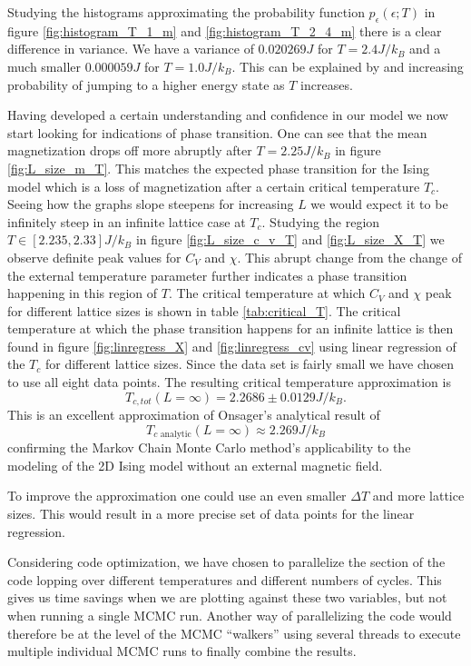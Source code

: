\documentclass[english,notitlepage,reprint,nofootinbib]{revtex4-1}  %
\begin{document}
Studying the histograms approximating the probability function $p_{\epsilon}(\epsilon;T)$ in figure \ref{fig:histogram_T_1_m} and \ref{fig:histogram_T_2_4_m} there is a clear difference in variance. We have a variance of $0.020269 J$ for $T=2.4J/k_B$ and a much smaller $0.000059 J$ for $T=1.0J/k_B$. This can be explained by and increasing probability of jumping to a higher energy state as $T$ increases.

Having developed a certain understanding and confidence in our model we now start looking for indications of phase transition. One can see that the mean magnetization drops off more abruptly after $T=2.25 J/k_B$ in figure \ref{fig:L_size_m_T}. This matches the expected phase transition for the Ising model which is a loss of magnetization after a certain critical temperature $T_c$. Seeing how the graphs slope steepens for increasing $L$ we would expect it to be infinitely steep in an infinite lattice case at $T_c$. Studying the region $T \in [2.235,2.33]J/k_B$ in figure \ref{fig:L_size_c_v_T} and \ref{fig:L_size_X_T} we observe definite peak values for $C_V$ and $\chi$. This abrupt change from the change of the external temperature parameter further indicates a phase transition happening in this region of $T$. The critical temperature at which $C_V$ and $\chi$ peak for different lattice sizes is shown in table \ref{tab:critical_T}. The critical temperature at which the phase transition happens for an infinite lattice is then found in figure \ref{fig:linregress_X} and \ref{fig:linregress_cv} using linear regression of the $T_c$ for different lattice sizes. Since the data set is fairly small we have chosen to use all eight data points. The resulting critical temperature approximation is
\begin{equation}
    T_{c,tot}(L=\infty) = 2.2686 \pm 0.0129  J/k_B.
\end{equation}
This is an excellent approximation of Onsager's analytical result of
\begin{equation}
    T_{c \text{ analytic}}(L=\infty) \approx 2.269 J/k_B
\end{equation}
confirming the Markov Chain Monte Carlo method's applicability to the modeling of the 2D Ising model without an external magnetic field.

To improve the approximation one could use an even smaller $\Delta T$ and more lattice sizes. This would result in a more precise set of data points for the linear regression.

Considering code optimization, we have chosen to parallelize the section of the code lopping over different temperatures and different numbers of cycles. This gives us time savings when we are plotting against these two variables, but not when running a single MCMC run. Another way of parallelizing the code would therefore be at the level of the MCMC ``walkers'' using several threads to execute multiple individual MCMC runs to finally combine the results.
\end{document}
